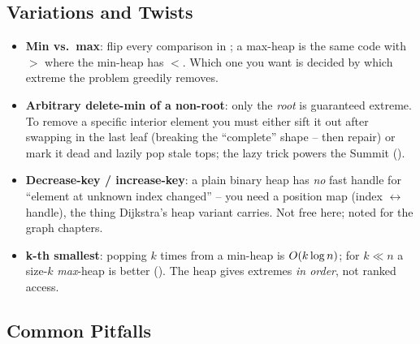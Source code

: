 \subsection{Variations and Twists}

\begin{itemize}[nosep]
  \item \textbf{Min vs.\ max}: flip every comparison in ; a max-heap is the same code
        with $>$ where the min-heap has $<$. Which one you want is decided by which extreme the problem
        greedily removes. \hfill{}
  \item \textbf{Arbitrary delete-min of a non-root}: only the \emph{root} is guaranteed extreme. To remove
        a specific interior element you must either sift it out after swapping in the last leaf (breaking
        the ``complete'' shape -- then repair) or mark it dead and lazily pop stale tops; the lazy trick
        powers the Summit (). \hfill{}
  \item \textbf{Decrease-key / increase-key}: a plain binary heap has \emph{no} fast handle for ``element
        at unknown index changed'' -- you need a position map (index $\leftrightarrow$ handle), the thing
        Dijkstra's heap variant carries. Not free here; noted for the graph chapters. \hfill{}
  \item \textbf{k-th smallest}: popping $k$ times from a min-heap is $O(k\log n)$; for $k\ll n$ a
        size-$k$ \emph{max}-heap is better (). The heap gives extremes \emph{in order},
        not ranked access. \hfill{}
\end{itemize}

\subsection{Common Pitfalls}


